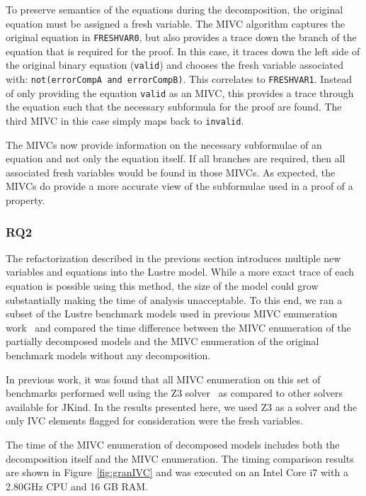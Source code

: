To preserve semantics of the equations during the decomposition, the original equation must be assigned a fresh variable. The MIVC algorithm captures the original equation in \texttt{FRESHVAR0}, but also provides a trace down the branch of the equation that is required for the proof. In this case, it traces down the left side of the original binary equation (\texttt{valid}) and chooses the fresh variable associated with: \texttt{not(errorCompA and errorCompB)}. This correlates to \texttt{FRESHVAR1}. Instead of only providing the equation \texttt{valid} as an MIVC, this provides a trace through the equation such that the necessary subformula for the proof are found. The third MIVC in this case simply maps back to \texttt{invalid}. 

The MIVCs now provide information on the necessary subformulae of an equation and not only the equation itself. If all branches are required, then all associated fresh variables would be found in those MIVCs. As expected, the MIVCs do provide a more accurate view of the subformulae used in a proof of a property. 

\subsubsection{RQ2}
The refactorization described in the previous section introduces multiple new variables and equations into the Lustre model. While a more exact trace of each equation is possible using this method, the size of the model could grow substantially making the time of analysis unacceptable. To this end, we ran a subset of the Lustre benchmark models used in previous MIVC enumeration work~\cite{ghassabani_2018} and compared the time difference between the MIVC enumeration of the partially decomposed models and the MIVC enumeration of the original benchmark models without any decomposition. 

In previous work, it was found that all MIVC enumeration on this set of benchmarks performed well using the Z3 solver~\cite{ghassabani_2018, z3} as compared to other solvers available for JKind. In the results presented here, we used Z3 as a solver and the only IVC elements flagged for consideration were the fresh variables. 

The time of the MIVC enumeration of decomposed models includes both the decomposition itself and the MIVC enumeration. The timing comparison results are shown in Figure~\ref{fig:granIVC} and was executed on an Intel Core i7 with a 2.80GHz CPU and 16 GB RAM. 

